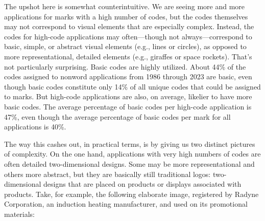 \documentclass[letterpaper, 11pt, oneside]{article}
\begin{document}


The upshot here is somewhat counterintuitive. We are seeing more and more applications for marks with a high number of codes, but the codes themselves may not correspond to visual elements that are especially complex. Instead, the codes for high-code applications may often—though not always—correspond to basic, simple, or abstract visual elements (e.g., lines or circles), as opposed to more representational, detailed elements (e.g., giraffes or space rockets). That's not particularly surprising. Basic codes are highly utilized. About 44\% of the codes assigned to nonword applications from 1986 through 2023 are basic, even though basic codes constitute only 14\% of all unique codes that could be assigned to marks. But high-code applications are also, on average, likelier to have more basic codes. The average percentage of basic codes per high-code application is 47\%, even though the average percentage of basic codes per mark for all applications is 40\%.

The way this cashes out, in practical terms, is by giving us two distinct pictures of complexity. On the one hand, applications with very high numbers of codes are often detailed two-dimensional designs. Some may be more representational and others more abstract, but they are basically still traditional logos: two-dimensional designs that are placed on products or displays associated with products. Take, for example, the following elaborate image, registered by Radyne Corporation, an induction heating manufacturer, and used on its promotional materials:
\end{document}

